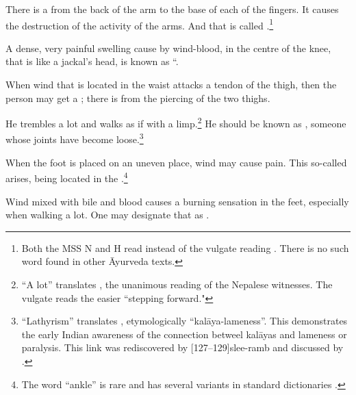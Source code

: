 \begin{translation}
        

\item[75]

There is a  from the back of the arm to the base of each 
of the fingers.  It causes the destruction of the activity of the arms.  And that is 
called .\footnote{Both the MSS N and H read 
 instead of the
	vulgate reading . There is no such word found in other
	Āyurveda texts.}

\item[76]

A dense, very painful swelling cause by wind-blood, in the centre of
the knee, that is like a jackal's head, is known as
“.


\item[77]

When wind that is located in the waist attacks a tendon of the thigh, then 
the person may get a ; there is 
 from the  piercing of the two thighs.

\item[78]

He trembles a lot and walks as if with a limp.\footnote{ “A lot”
    translates , the unanimous reading of the Nepalese
    witnesses.  The vulgate reads the easier 
    “stepping forward."} He should be known as , someone whose joints have become
    loose.\footnote{“Lathyrism” translates ,
        etymologically “\gls{kalāya}-lameness”.  This demonstrates the early
        Indian awareness of the connection betweel \glspl{kalāya} and lameness
        or paralysis.  This link was rediscovered by
        [127--129]{slee-ramb} and discussed by \citet{buch-1904}.}

\item[79]

When the foot is placed on an uneven place, wind may cause pain.  This  
so-called  arises, being located in the 
.\footnote{The word  “ankle” is rare and has 
several variants in standard dictionaries \citep[e.g.,][335]{moni-sans}.}

\item[80]

Wind mixed with bile and blood causes a burning sensation in the feet, 
especially when walking a lot.  One may designate that as 
.


\end{translation}
